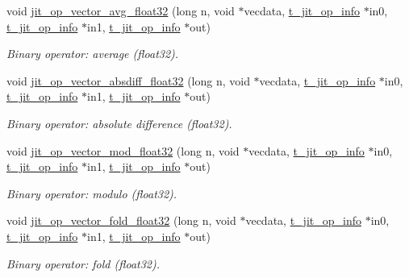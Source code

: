 \begin{DoxyCompactItemize}
void \hyperlink{group__opvecmod_ga738a6c10eeeae9ab6d01e02d8cb6f1af}{jit\_\-op\_\-vector\_\-avg\_\-float32} (long n, void $\ast$vecdata, \hyperlink{structt__jit__op__info}{t\_\-jit\_\-op\_\-info} $\ast$in0, \hyperlink{structt__jit__op__info}{t\_\-jit\_\-op\_\-info} $\ast$in1, \hyperlink{structt__jit__op__info}{t\_\-jit\_\-op\_\-info} $\ast$out)
\begin{DoxyCompactList}\small\item\em Binary operator: average (float32). \item\end{DoxyCompactList}\item 
void \hyperlink{group__opvecmod_ga8d6b5c9c995ed85836407486c1338cc5}{jit\_\-op\_\-vector\_\-absdiff\_\-float32} (long n, void $\ast$vecdata, \hyperlink{structt__jit__op__info}{t\_\-jit\_\-op\_\-info} $\ast$in0, \hyperlink{structt__jit__op__info}{t\_\-jit\_\-op\_\-info} $\ast$in1, \hyperlink{structt__jit__op__info}{t\_\-jit\_\-op\_\-info} $\ast$out)
\begin{DoxyCompactList}\small\item\em Binary operator: absolute difference (float32). \item\end{DoxyCompactList}\item 
void \hyperlink{group__opvecmod_gaebb1d0ab45373a92e749098f681e0b79}{jit\_\-op\_\-vector\_\-mod\_\-float32} (long n, void $\ast$vecdata, \hyperlink{structt__jit__op__info}{t\_\-jit\_\-op\_\-info} $\ast$in0, \hyperlink{structt__jit__op__info}{t\_\-jit\_\-op\_\-info} $\ast$in1, \hyperlink{structt__jit__op__info}{t\_\-jit\_\-op\_\-info} $\ast$out)
\begin{DoxyCompactList}\small\item\em Binary operator: modulo (float32). \item\end{DoxyCompactList}\item 
void \hyperlink{group__opvecmod_gae5bb9c10649a7549663b2f5f50e057b8}{jit\_\-op\_\-vector\_\-fold\_\-float32} (long n, void $\ast$vecdata, \hyperlink{structt__jit__op__info}{t\_\-jit\_\-op\_\-info} $\ast$in0, \hyperlink{structt__jit__op__info}{t\_\-jit\_\-op\_\-info} $\ast$in1, \hyperlink{structt__jit__op__info}{t\_\-jit\_\-op\_\-info} $\ast$out)
\begin{DoxyCompactList}\small\item\em Binary operator: fold (float32). \item\end{DoxyCompactList}\item 

\end{DoxyCompactItemize}
